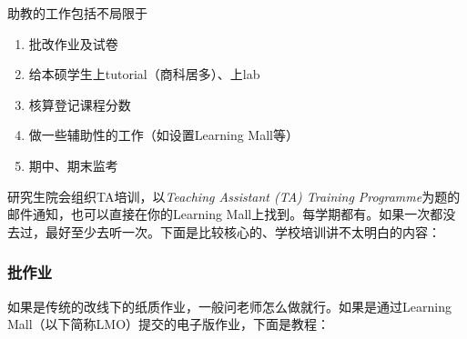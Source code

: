 助教的工作包括不局限于
\begin{enumerate}
    \item 批改作业及试卷
    \item 给本硕学生上tutorial（商科居多）、上lab
    \item 核算登记课程分数
    \item 做一些辅助性的工作（如设置Learning Mall等）
    \item 期中、期末监考
\end{enumerate}

研究生院会组织TA培训，以\textit{Teaching Assistant (TA) Training Programme}为题的邮件通知，也可以直接在你的Learning Mall上找到。每学期都有。如果一次都没去过，最好至少去听一次。下面是比较核心的、学校培训讲不太明白的内容：

\subsubsection{批作业}
如果是传统的改线下的纸质作业，一般问老师怎么做就行。如果是通过Learning Mall（以下简称LMO）提交的电子版作业，下面是教程：
